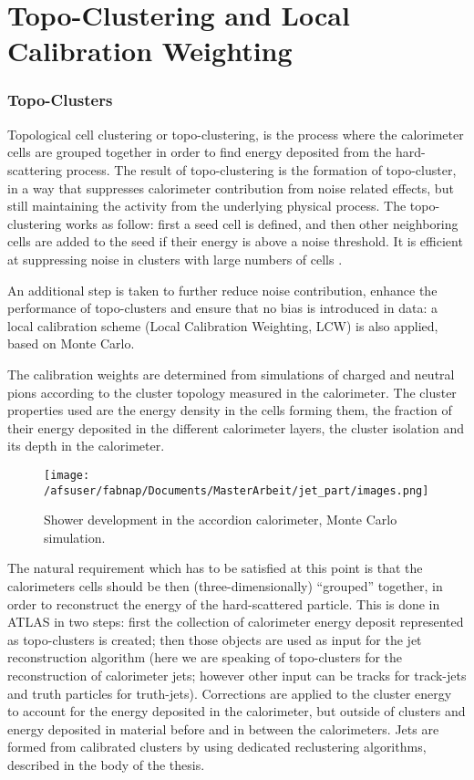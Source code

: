 \section{Topo-Clustering and Local Calibration Weighting}
\subsubsection{Topo-Clusters}
Topological cell clustering or topo-clustering, is the process where the calorimeter cells are grouped together in order to find energy deposited from the hard-scattering process. The result of topo-clustering is the formation of topo-cluster, in a way that suppresses calorimeter contribution from noise related effects, but still maintaining the activity from the underlying physical process.
The topo-clustering works as follow: first a seed cell is defined, and then other neighboring cells are added to the seed if their energy is above a noise threshold. 
It is efficient at suppressing noise in clusters with large numbers of cells \cite{topocluster}. 

An additional step is taken to further reduce noise contribution, enhance the performance of topo-clusters and ensure that no bias is introduced in data: a local calibration scheme (Local Calibration Weighting, LCW) \cite{lcw} is also applied, based on Monte Carlo.

The calibration weights are determined from simulations of charged and neutral pions according to the cluster topology measured in the calorimeter. The cluster properties
used are the energy density in the cells forming them, the fraction of their energy deposited in the different calorimeter layers, the cluster isolation and its depth in the calorimeter.
\begin{wrapfigure}{R}{0.5\textwidth}
  \centering
\texttt{[image: /afsuser/fabnap/Documents/MasterArbeit/jet\_part/images.png]}
  \caption[Shower development in the accordion calorimeter]{Shower development in the accordion calorimeter, Monte Carlo simulation.}
  \label{fig:accordion}
\end{wrapfigure}
The natural requirement which has to be satisfied at this point is that the calorimeters cells should be then (three-dimensionally) ``grouped'' together, in order to reconstruct the energy of the hard-scattered particle. This is done in ATLAS in two steps: first the collection of calorimeter energy deposit represented as topo-clusters is created; then those objects are used as input for the jet reconstruction algorithm (here we are speaking of topo-clusters for the reconstruction of calorimeter jets; however other input can be tracks for track-jets and truth particles for truth-jets). 
Corrections are applied to the cluster energy to account for the energy deposited in the calorimeter, but outside of clusters and energy deposited in material before and in between the calorimeters. Jets are formed from calibrated clusters by using dedicated reclustering algorithms, described in the body of the thesis.

